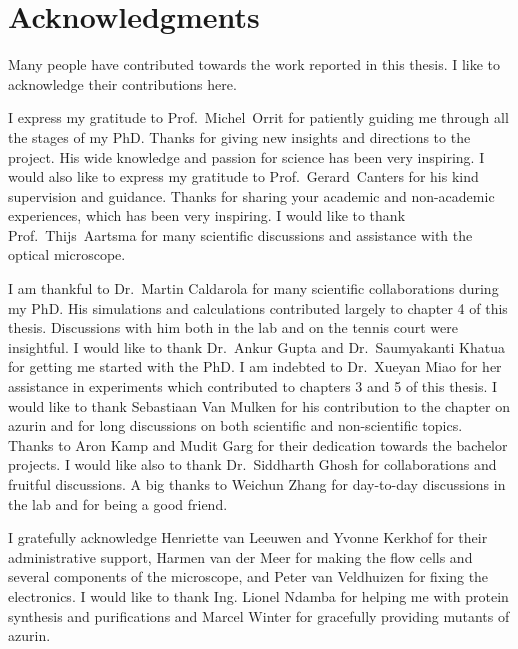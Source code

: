 \chapter*{Acknowledgments}
\label{ch:Acknowledgments}

Many people have contributed towards the work reported in this thesis.
I like to acknowledge their contributions here.

I express my gratitude to Prof.~Michel~Orrit for patiently guiding me through all the stages of my PhD.
Thanks for giving new insights and directions to the project.
His wide knowledge and passion for science has been very inspiring.
I would also like to express my gratitude to Prof.~Gerard~Canters for his kind supervision and guidance.
Thanks for sharing your academic and non-academic experiences, which has been very inspiring.
I would like to thank Prof.~Thijs~Aartsma for many scientific discussions and assistance with the optical microscope.

I am thankful to Dr.~Martin Caldarola for many scientific collaborations during my PhD.
His simulations and calculations contributed largely to chapter 4 of this thesis.
Discussions with him both in the lab and on the tennis court were insightful.
I would like to thank Dr.~Ankur Gupta and Dr.~Saumyakanti Khatua for getting me started with the PhD.
I am indebted to Dr.~Xueyan Miao for her assistance in experiments which contributed to chapters 3 and 5 of this thesis.
I would like to thank Sebastiaan Van Mulken for his contribution to the chapter on azurin and for long discussions on both scientific and non-scientific topics.
Thanks to Aron Kamp and Mudit Garg for their dedication towards the bachelor projects.
I would like also to thank Dr.~Siddharth Ghosh for collaborations and fruitful discussions.
A big thanks to Weichun Zhang for day-to-day discussions in the lab and for being a good friend. 

I gratefully acknowledge Henriette van Leeuwen and Yvonne Kerkhof for their administrative support, Harmen van der Meer for making the flow cells and several components of the microscope, and Peter van Veldhuizen for fixing the electronics.
I would like to thank Ing. Lionel Ndamba for helping me with protein synthesis and purifications and Marcel Winter for gracefully providing mutants of azurin. 

